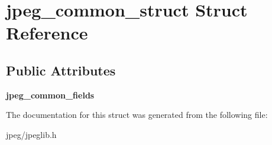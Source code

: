 \hypertarget{structjpeg__common__struct}{}\section{jpeg\+\_\+common\+\_\+struct Struct Reference}
\label{structjpeg__common__struct}
\subsection*{Public Attributes}
\begin{DoxyCompactItemize}
\item 
{\bfseries jpeg\+\_\+common\+\_\+fields}\hypertarget{structjpeg__common__struct_af0328603f836658f65d39679f6bbfa7a}{}\label{structjpeg__common__struct_af0328603f836658f65d39679f6bbfa7a}

\end{DoxyCompactItemize}


The documentation for this struct was generated from the following file\+:\begin{DoxyCompactItemize}
\item 
jpeg/jpeglib.\+h\end{DoxyCompactItemize}
